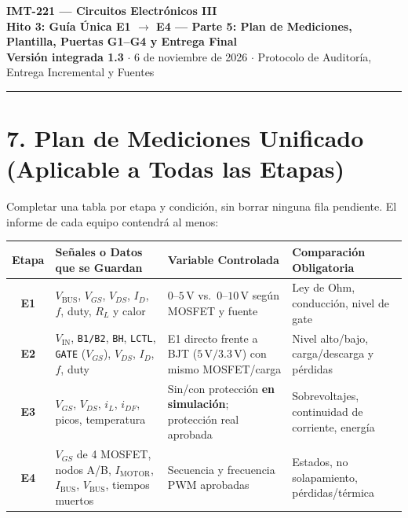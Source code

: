 \documentclass[10pt, a4paper, landscape]{article}
\begin{document}
\noindent
{\LARGE \textbf{\textcolor{ucbblue}{IMT-221 — Circuitos Electrónicos III}}}\\[0.12cm]
{\Large \textbf{Hito 3: Guía Única E1 $\rightarrow$ E4 — Parte 5: Plan de Mediciones, Plantilla, Puertas G1--G4 y Entrega Final}}\\[0.08cm]
{\small \textbf{Versión integrada 1.3} $\cdot$ 6 de noviembre de 2026 $\cdot$ Protocolo de Auditoría, Entrega Incremental y Fuentes}
\par\vspace{0.15cm}\noindent\rule{\linewidth}{0.4pt}\vspace{0.2cm}

\section*{7. Plan de Mediciones Unificado (Aplicable a Todas las Etapas)}

Completar una tabla por etapa y condición, sin borrar ninguna fila pendiente. El informe de cada equipo contendrá al menos:

\par\vspace{0.1cm}\noindent
\renewcommand{\arraystretch}{1.25}
\begin{tabularx}{\linewidth}{|c|>{\raggedright\arraybackslash}p{5.8cm}|>{\raggedright\arraybackslash}p{5.5cm}|>{\raggedright\arraybackslash}X|}
\hline
\rowcolor{ucbgray}
\textbf{Etapa} & \textbf{Señales o Datos que se Guardan} & \textbf{Variable Controlada} & \textbf{Comparación Obligatoria} \\ \hline
\textbf{E1} & $V_{\text{BUS}}$, $V_{GS}$, $V_{DS}$, $I_D$, $f$, duty, $R_L$ y calor & $0\text{--}5\,\text{V}$ vs.\ $0\text{--}10\,\text{V}$ según MOSFET y fuente & Ley de Ohm, conducción, nivel de gate \\ \hline
\textbf{E2} & $V_{\text{IN}}$, \texttt{B1/B2}, \texttt{BH}, \texttt{LCTL}, \texttt{GATE} ($V_{GS}$), $V_{DS}$, $I_D$, $f$, duty & E1 directo frente a BJT ($5\,\text{V}/3.3\,\text{V}$) con mismo MOSFET/carga & Nivel alto/bajo, carga/descarga y pérdidas \\ \hline
\textbf{E3} & $V_{GS}$, $V_{DS}$, $i_L$, $i_{DF}$, picos, temperatura & Sin/con protección \textbf{en simulación}; protección real aprobada & Sobrevoltajes, continuidad de corriente, energía \\ \hline
\textbf{E4} & $V_{GS}$ de 4 MOSFET, nodos A/B, $I_{\text{MOTOR}}$, $I_{\text{BUS}}$, $V_{\text{BUS}}$, tiempos muertos & Secuencia y frecuencia PWM aprobadas & Estados, no solapamiento, pérdidas/térmica \\ \hline
\end{tabularx}
\end{document}
